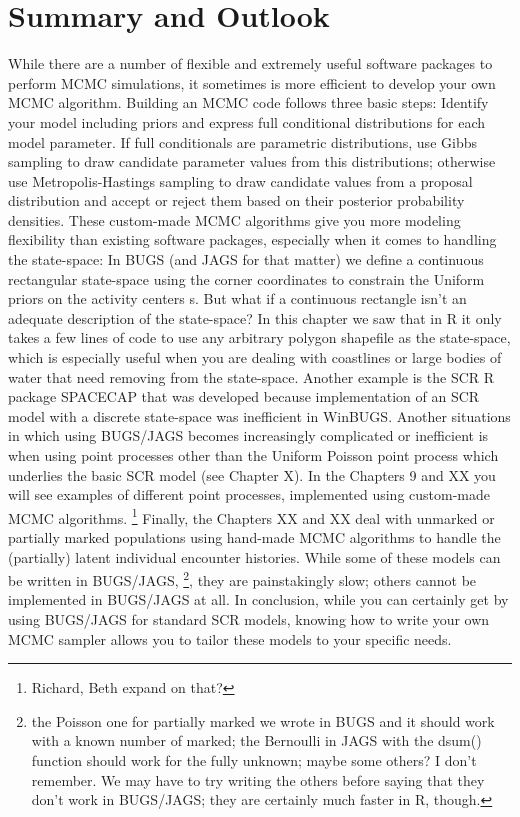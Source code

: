 \section{Summary and Outlook}
While there are a number of flexible and extremely useful software packages to perform MCMC simulations, it sometimes is more efficient to develop your own MCMC algorithm. Building an MCMC code follows three basic steps: Identify your model including priors and express full conditional distributions for each model parameter. If full conditionals are parametric distributions, use Gibbs sampling to draw candidate parameter values from this distributions; otherwise use Metropolis-Hastings sampling to draw candidate values from a proposal distribution and accept or reject them based on their posterior probability densities. 
These custom-made MCMC algorithms give you more modeling flexibility than existing software packages, especially when it comes to handling the state-space: In BUGS (and JAGS for that matter) we define a continuous rectangular state-space using the corner coordinates to constrain the Uniform priors on the activity centers s. But what if a continuous rectangle isn't an adequate description of the state-space? In this chapter we saw that in R it only takes a few lines of code to use any arbitrary polygon shapefile as the state-space, which is especially useful when you are dealing with coastlines or large bodies of water that need removing from the state-space. Another example is the SCR R package SPACECAP \citep{gopalaswamy_etal:2011} that was developed because implementation of an SCR model with a discrete state-space was inefficient in WinBUGS. 
Another situations in which using BUGS/JAGS becomes increasingly complicated or inefficient is when using point processes other than the Uniform Poisson point process which underlies the basic SCR model (see Chapter X). In the Chapters 9 and XX you will see examples of different point processes, implemented using custom-made MCMC algorithms. \footnote{Richard, Beth expand on that?}
Finally, the Chapters XX and XX deal with unmarked or partially marked populations using hand-made MCMC algorithms to handle the (partially) latent individual encounter histories. While some of these models can be written in BUGS/JAGS, \footnote{the Poisson one for partially marked we wrote in BUGS and it should work with a known number of marked; the Bernoulli in JAGS with the dsum() function should work for the fully unknown; maybe some others? I don’t remember. We may have to try writing the others before saying that they don’t work in BUGS/JAGS; they are certainly much faster in R, though.}, they are painstakingly slow; others cannot be implemented in BUGS/JAGS at all.    
In conclusion, while you can certainly get by using BUGS/JAGS for standard SCR models, knowing how to write your own MCMC sampler allows you to tailor these models to your specific needs. 
